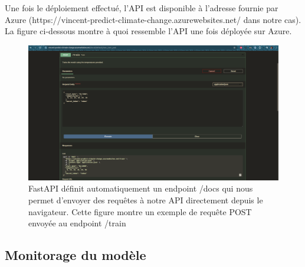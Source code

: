 \documentclass[french]{article}
\begin{document}
    Une fois le déploiement effectué, l'API est disponible à l'adresse fournie par Azure (https://vincent-predict-climate-change.azurewebsites.net/ dans notre cas). La figure ci-dessous montre à quoi ressemble l'API une fois déployée sur Azure.

    \begin{figure}[h]
        \includegraphics[width=12cm]{api_azure}
        \centering
        \caption{FastAPI définit automatiquement un endpoint /docs qui nous permet d'envoyer des requêtes à notre API directement depuis le navigateur. Cette figure montre un exemple de requête POST envoyée au endpoint /train}
        \centering
    \end{figure}

    \subsection{Monitorage du modèle}
    
\end{document}
